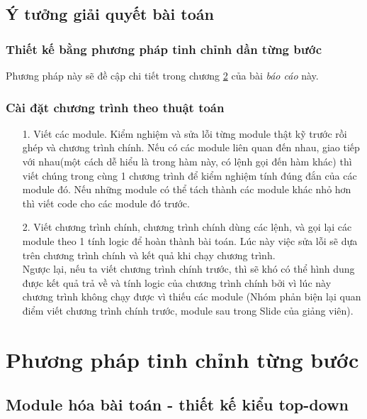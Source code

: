 \documentclass[twoside]{report2}
\begin{document}
\section{Ý tưởng giải quyết bài toán}

\subsection{Thiết kế bằng phương pháp tinh chỉnh dần từng bước}
Phương pháp này sẽ đề cập chi tiết trong chương \ref{chap:2} của bài \emph{báo cáo} này.

\subsection{Cài đặt chương trình theo thuật toán}
\begin{itemize}
	\item[1.] Viết các module. Kiểm nghiệm và sửa lỗi từng module thật kỹ trước rồi ghép và chương trình chính. Nếu có các module liên quan đến nhau, giao tiếp với nhau(một cách dễ hiểu là trong hàm này, có lệnh gọi đến hàm khác) thì viết chúng trong cùng 1 chương trình để kiểm nghiệm tính đúng đắn của các module đó. Nếu những module có thể tách thành các module khác nhỏ hơn thì viết code cho các module đó trước.
	\item[2.] Viết chương trình chính, chương trình chính dùng các lệnh, và gọi lại các module theo 1 tính logic để hoàn thành bài toán. Lúc này việc sửa lỗi sẽ dựa trên chương trình chính và kết quả khi chạy chương trình.\\Ngược lại, nếu ta viết chương trình chính trước, thì sẽ khó có thể hình dung được kết quả trả về và tính logic của chương trình chính bởi vì lúc này chương trình không chạy được vì thiếu các module (Nhóm phản biện lại quan điểm viết chương trình chính trước, module sau trong Slide của giảng viên).

\end{itemize}

\chapter{Phương pháp tinh chỉnh từng bước}
\label{chap:2}

\section{Module hóa bài toán - thiết kế kiểu top-down}
\label{sec:21}
\end{document}
